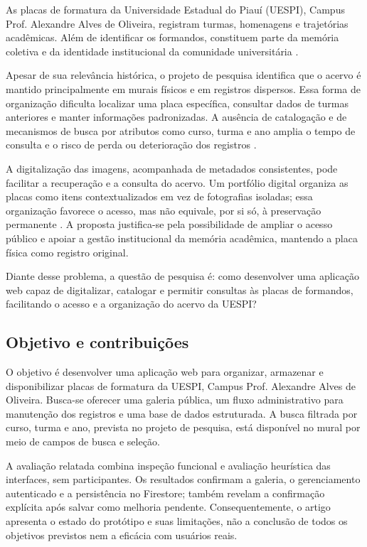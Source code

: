 \documentclass[12pt]{article}
\begin{document}
As placas de formatura da Universidade Estadual do Piauí (UESPI), Campus Prof.
Alexandre Alves de Oliveira, registram turmas, homenagens e trajetórias
acadêmicas. Além de identificar os formandos, constituem parte da memória
coletiva e da identidade institucional da comunidade universitária
\cite{halbwachs1990,belluzzo2011}.

Apesar de sua relevância histórica, o projeto de pesquisa identifica que o
acervo é mantido principalmente em murais físicos e em registros dispersos.
Essa forma de organização dificulta localizar uma placa específica, consultar
dados de turmas anteriores e manter informações padronizadas. A ausência de
catalogação e de mecanismos de busca por atributos como curso, turma e ano
amplia o tempo de consulta e o risco de perda ou deterioração dos registros
\cite{vitorino2011}.

A digitalização das imagens, acompanhada de metadados consistentes, pode
facilitar a recuperação e a consulta do acervo. Um portfólio digital organiza
as placas como itens contextualizados em vez de fotografias isoladas; essa
organização favorece o acesso, mas não equivale, por si só, à preservação
permanente \cite{conway1996,ribeiro2018}. A proposta justifica-se pela
possibilidade de ampliar o acesso público e apoiar a gestão institucional da
memória acadêmica, mantendo a placa física como registro original.

Diante desse problema, a questão de pesquisa é: como desenvolver uma aplicação
web capaz de digitalizar, catalogar e permitir consultas às placas de
formandos, facilitando o acesso e a organização do acervo da UESPI?

\subsection{Objetivo e contribuições}

O objetivo é desenvolver uma aplicação web para organizar, armazenar e
disponibilizar placas de formatura da UESPI, Campus Prof. Alexandre Alves de
Oliveira. Busca-se oferecer uma galeria pública, um fluxo administrativo para
manutenção dos registros e uma base de dados estruturada. A busca filtrada por
curso, turma e ano, prevista no projeto de pesquisa, está disponível no mural
por meio de campos de busca e seleção.

A avaliação relatada combina inspeção funcional e avaliação heurística das
interfaces, sem participantes. Os resultados confirmam a galeria, o
gerenciamento autenticado e a persistência no Firestore; também revelam a confirmação explícita após salvar como melhoria pendente.
Consequentemente, o artigo apresenta o estado do protótipo e suas limitações,
não a conclusão de todos os objetivos previstos nem a eficácia com usuários
reais.
\end{document}
